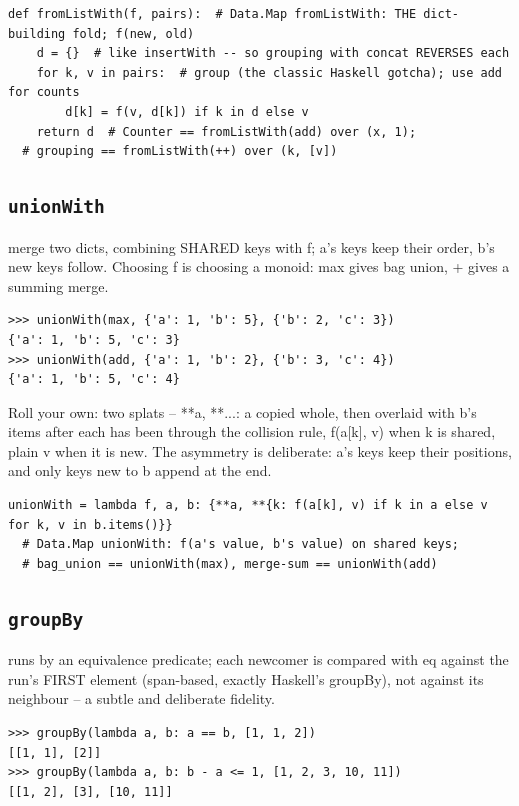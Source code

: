 \documentclass[10pt,letterpaper]{book}
\begin{document}
\begin{lstlisting}[style=ex]
def fromListWith(f, pairs):  # Data.Map fromListWith: THE dict-building fold; f(new, old)
    d = {}  # like insertWith -- so grouping with concat REVERSES each
    for k, v in pairs:  # group (the classic Haskell gotcha); use add for counts
        d[k] = f(v, d[k]) if k in d else v
    return d  # Counter == fromListWith(add) over (x, 1);
  # grouping == fromListWith(++) over (k, [v])
\end{lstlisting}

\subsection{\texttt{unionWith}}\label{def:unionWith}
merge two dicts, combining SHARED keys with f; a's keys keep their order, b's new keys follow. Choosing f is choosing a monoid: max gives bag union, + gives a summing merge.
\begin{lstlisting}[style=ex]
>>> unionWith(max, {'a': 1, 'b': 5}, {'b': 2, 'c': 3})
{'a': 1, 'b': 5, 'c': 3}
>>> unionWith(add, {'a': 1, 'b': 2}, {'b': 3, 'c': 4})
{'a': 1, 'b': 5, 'c': 4}
\end{lstlisting}

Roll your own: two splats -- {**a, **{...}}: a copied whole, then overlaid with b's items after each has been through the collision rule, f(a[k], v) when k is shared, plain v when it is new. The asymmetry is deliberate: a's keys keep their positions, and only keys new to b append at the end.

\begin{lstlisting}[style=ex]
unionWith = lambda f, a, b: {**a, **{k: f(a[k], v) if k in a else v for k, v in b.items()}}
  # Data.Map unionWith: f(a's value, b's value) on shared keys;
  # bag_union == unionWith(max), merge-sum == unionWith(add)
\end{lstlisting}

\subsection{\texttt{groupBy}}\label{def:groupBy}
runs by an equivalence predicate; each newcomer is compared with eq against the run's FIRST element (span-based, exactly Haskell's groupBy), not against its neighbour -- a subtle and deliberate fidelity.
\begin{lstlisting}[style=ex]
>>> groupBy(lambda a, b: a == b, [1, 1, 2])
[[1, 1], [2]]
>>> groupBy(lambda a, b: b - a <= 1, [1, 2, 3, 10, 11])
[[1, 2], [3], [10, 11]]
\end{lstlisting}
\end{document}
